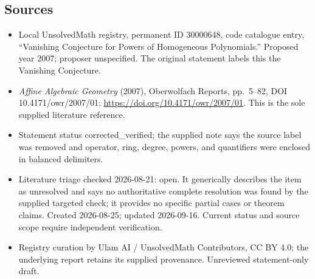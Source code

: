 \documentclass[11pt]{article}
\begin{document}
\subsection{Sources}
\begin{itemize}
\item Local UnsolvedMath registry, permanent ID 30000648, code catalogue entry, ``Vanishing Conjecture for Powers of Homogeneous Polynomials.'' Proposed year 2007; proposer unspecified. The original statement labels this the Vanishing Conjecture.
\item \emph{Affine Algebraic Geometry} (2007), Oberwolfach Reports, pp.\ 5--82, DOI 10.4171/owr/2007/01; \url{https://doi.org/10.4171/owr/2007/01}. This is the sole supplied literature reference.
\item Statement status corrected\_verified; the supplied note says the source label was removed and operator, ring, degree, powers, and quantifiers were enclosed in balanced delimiters.
\item Literature triage checked 2026-08-21: open. It generically describes the item as unresolved and says no authoritative complete resolution was found by the supplied targeted check; it provides no specific partial cases or theorem claims. Created 2026-08-25; updated 2026-09-16. Current status and source scope require independent verification.
\item Registry curation by Ulam AI / UnsolvedMath Contributors, CC BY 4.0; the underlying report retains its supplied provenance. Unreviewed statement-only draft.
\end{itemize}
\end{document}
